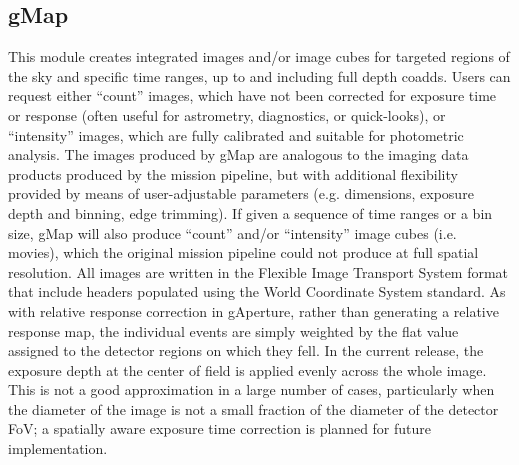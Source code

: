 \documentclass[preprint]{aastex}
\begin{document}
\subsection{gMap}
This module creates integrated images and/or image cubes for targeted regions of the sky and specific time ranges, up to and including full depth coadds. Users can request either ``count'' images, which have not been corrected for exposure time or response (often useful for astrometry, diagnostics, or quick-looks), or ``intensity'' images, which are fully calibrated and suitable for photometric analysis. The images produced by gMap are analogous to the imaging data products produced by the mission pipeline, but with additional flexibility provided by means of user-adjustable parameters (e.g. dimensions, exposure depth and binning, edge trimming). If given a sequence of time ranges or a bin size, gMap will also produce ``count'' and/or ``intensity'' image cubes (i.e. movies), which the original mission pipeline could not produce at full spatial resolution. All images are written in the Flexible Image Transport System \citep[FITS,][]{pen2010} format that include headers populated using the World Coordinate System \citep[WCS,][]{gre2002,cal2002} standard.  As with relative response correction in gAperture, rather than generating a relative response map, the individual events are simply weighted by the flat value assigned to the detector regions on which they fell. In the current release, the exposure depth at the center of field is applied evenly across the whole image. This is not a good approximation in a large number of cases, particularly when the diameter of the image is not a small fraction of the diameter of the detector FoV; a spatially aware exposure time correction is planned for future implementation.
\end{document}

